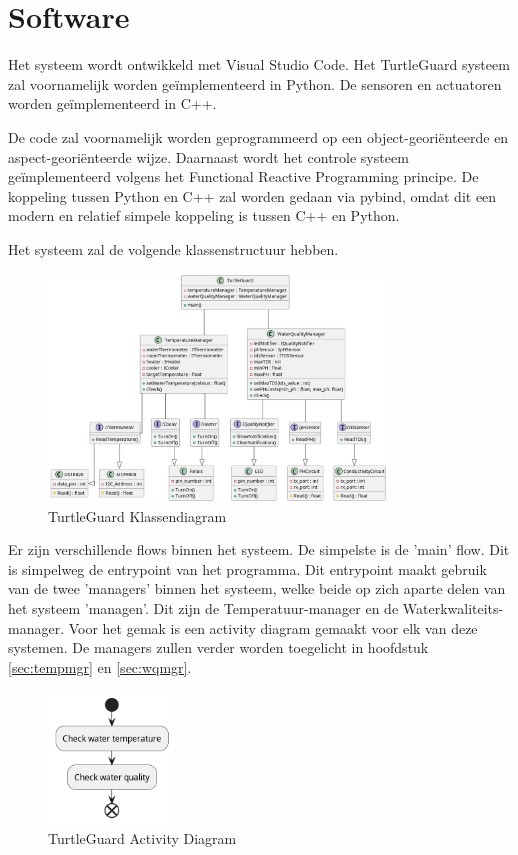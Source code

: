 \documentclass[a4paper]{report}
\newcommand{\turtleguard}{\mbox{TurtleGuard\texttrademark}\xspace}
\begin{document}
\section{Software}
Het systeem wordt ontwikkeld met Visual Studio Code. Het \turtleguard systeem zal voornamelijk worden geïmplementeerd in Python. De sensoren en actuatoren worden geïmplementeerd in C++.

De code zal voornamelijk worden geprogrammeerd op een object-georiënteerde en aspect-georiënteerde wijze. 
Daarnaast wordt het controle systeem geïmplementeerd volgens het Functional Reactive Programming principe.
De koppeling tussen Python en C++ zal worden gedaan via pybind, omdat dit een modern en relatief simpele koppeling is tussen C++ en Python.

Het systeem zal de volgende klassenstructuur hebben.
\begin{figure}[h]
  \centering
  \includegraphics[width=0.8\textwidth]{Images/classdiagram.png}
  \caption{\turtleguard Klassendiagram}
  \label{fig:classdiagram}
\end{figure}

\par \smallskip
Er zijn verschillende flows binnen het systeem. De simpelste is de 'main' flow. Dit is simpelweg de entrypoint van het programma.
Dit entrypoint maakt gebruik van de twee 'managers' binnen het systeem, welke beide op zich aparte delen van het systeem 'managen'.
Dit zijn de Temperatuur-manager en de Waterkwaliteits-manager. 
Voor het gemak is een activity diagram gemaakt voor elk van deze systemen. De managers zullen verder worden toegelicht in hoofdstuk \ref{sec:tempmgr} en \ref{sec:wqmgr}. 


\begin{figure}[H]
  \centering
  \includegraphics[width=0.3\textwidth]{Images/ActivityDiagram.png}
  \caption{\turtleguard Activity Diagram}
  \label{fig:activitydiagram}
\end{figure}
\end{document}
